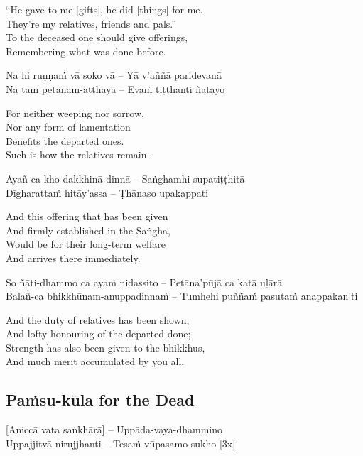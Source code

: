 \begin{english}
  “He gave to me [gifts], he did [things] for me.\\
  They're my relatives, friends and pals.”\\
  To the deceased one should give offerings,\\
  Remembering what was done before.
\end{english}

Na hi ruṇṇaṁ vā soko vā – Yā v’aññā paridevanā\\
Na taṁ petānam-atthāya – Evaṁ tiṭṭhanti ñātayo

\begin{english}
  For neither weeping nor sorrow,\\
  Nor any form of lamentation\\
  Benefits the departed ones.\\
  Such is how the relatives remain.
\end{english}

Ayañ-ca kho dakkhinā dinnā – Saṅghamhi supatiṭṭhitā\\
Dīgharattaṁ hitāy’assa – Ṭhānaso upakappati

\begin{english}
  And this offering that has been given\\
  And firmly established in the Saṅgha,\\
  Would be for their long-term welfare\\
  And arrives there immediately.
\end{english}

So ñāti-dhammo ca ayaṁ nidassito – Petāna’pūjā ca katā uḷārā\\
Balañ-ca bhikkhūnam-anuppadinnaṁ – Tumhehi puññaṁ pasutaṁ anappakan’ti

\begin{english}
  And the duty of relatives has been shown,\\
  And lofty honouring of the departed done;\\
  Strength has also been given to the bhikkhus,\\
  And much merit accumulated by you all.
\end{english}

\suttaRef{[Khp 7]}

\subsection{Paṁsu-kūla for the Dead}
\label{pamsu-kula-dead}
[Aniccā vata saṅkhārā] – Uppāda-vaya-dhammino\\
Uppajjitvā nirujjhanti – Tesaṁ vūpasamo sukho \hfill{[3x]}


